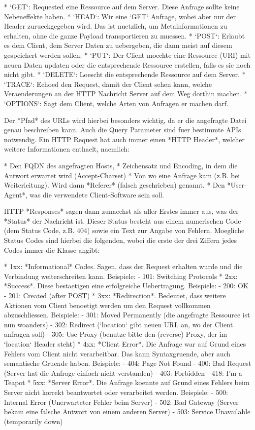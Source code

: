 * `GET`: Requested eine Ressource auf dem Server. Diese Anfrage sollte keine
  Nebeneffekte haben.
* `HEAD`: Wir eine `GET` Anfrage, wobei aber nur der Header zurueckgegeben
  wird. Das ist nuetzlich, um Metainformationen zu erhalten, ohne die ganze
  Payload transportieren zu muessen.
* `POST`: Erlaubt es dem Client, dem Server Daten zu uebergeben, die dann meist
  auf diesem gespeichert werden sollen.
* `PUT`: Der Client moechte eine Ressource (URI) mit neuen Daten updaten oder
  die entsprechende Ressource erstellen, falls es sie noch nicht gibt.
* `DELETE`: Loescht die entsprechende Ressource auf dem Server.
* `TRACE`: Echoed den Request, damit der Client sehen kann, welche
  Veraenderungen an der HTTP Nachricht Server auf dem Weg dorthin machen.
* `OPTIONS`: Sagt dem Client, welche Arten von Anfragen er machen darf.

Der *Pfad* des URLs wird hierbei besonders wichtig, da er die angefragte Datei
genau beschreiben kann. Auch die Query Parameter sind fuer bestimmte APIs
notwendig. Ein HTTP Request hat auch immer einen *HTTP Header*, welcher weitere
Informationen enthaelt, naemlich:

* Den FQDN des angefragten Hosts,
* Zeichensatz und Encoding, in dem die Antwort erwartet wird (Accept-Charset)
* Von wo eine Anfrage kam (z.B. bei Weiterleitung). Wird dann *Referer* (falsch
  geschrieben) genannt.
* Den *User-Agent*, was die verwendete Client-Software sein soll.

HTTP *Responses* sagen dann zunaechst als aller Erstes immer aus, was der
*Status* der Nachricht ist. Dieser Status besteht aus einem numerischen Code
(dem Status Code, z.B. 404) sowie ein Text zur Angabe von Fehlern. Moegliche
Status Codes sind hierbei die folgenden, wobei die erste der drei Ziffern jedes
Codes immer die Klasse angibt:

* 1xx: *Informational* Codes. Sagen, dass der Request erhalten wurde und die
  Verbindung weiterschreiten kann. Beispiele:
  - 101: Switching Protocols
* 2xx: *Success*. Diese bestaetigen eine erfolgreiche Uebertragung. Beispiele:
  - 200: OK
  - 201: Created (after POST)
* 3xx: *Redirection*. Bedeutet, dass weitere Aktionen vom Client benoetigt
  werden um den Request vollkommen abzuschliessen. Beispiele:
  - 301: Moved Permanently (die angefragte Ressource ist nun woanders)
  - 302: Redirect (`location` gibt neuen URL an, wo der Client anfragen soll)
  - 305: Use Proxy (benutze bitte den (reverse) Proxy, der im `location` Header steht)
* 4xx: *Client Error*. Die Anfrage war auf Grund eines Fehlers vom Client nicht
  verarbeitbar. Das kann Syntaxgruende, aber auch semantische Gruende
  haben. Beispiele:
  - 404: Page Not Found
  - 400: Bad Request (Server hat die Anfrage einfach nicht verstanden)
  - 403: Forbidden
  - 418: I'm a Teapot
* 5xx: *Server Error*. Die Anfrage koennte auf Grund eines Fehlers beim Server
  nicht korrekt beantwortet oder verarbeitet werden. Beispiele:
  - 500: Internal Error (Unerwarteter Fehler beim Server)
  - 502: Bad Gateway (Server bekam eine falsche Antwort von einem anderen
    Server)
  - 503: Service Unavailable (temporarily down)

